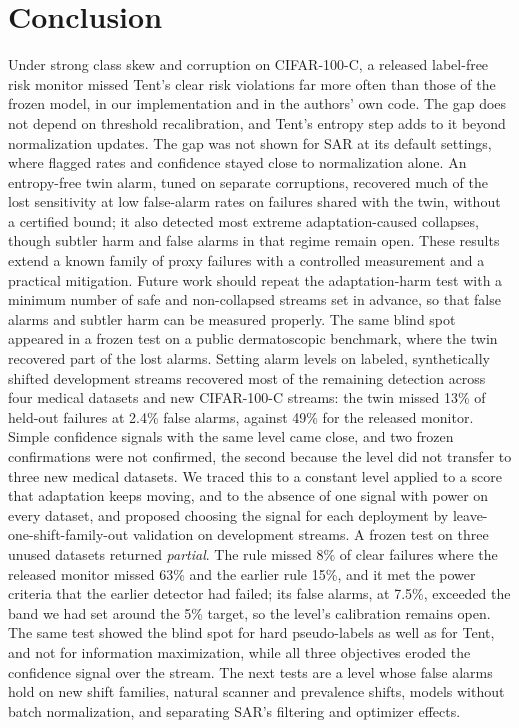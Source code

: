 \documentclass[runningheads]{llncs}
\begin{document}
\section{Conclusion}
Under strong class skew and corruption on CIFAR-100-C, a released label-free risk monitor missed Tent's clear risk violations far more often than those of the frozen model, in our implementation and in the authors' own code. The gap does not depend on threshold recalibration, and Tent's entropy step adds to it beyond normalization updates. The gap was not shown for SAR at its default settings, where flagged rates and confidence stayed close to normalization alone. An entropy-free twin alarm, tuned on separate corruptions, recovered much of the lost sensitivity at low false-alarm rates on failures shared with the twin, without a certified bound; it also detected most extreme adaptation-caused collapses, though subtler harm and false alarms in that regime remain open. These results extend a known family of proxy failures with a controlled measurement and a practical mitigation. Future work should repeat the adaptation-harm test with a minimum number of safe and non-collapsed streams set in advance, so that false alarms and subtler harm can be measured properly. The same blind spot appeared in a frozen test on a public dermatoscopic benchmark, where the twin recovered part of the lost alarms. Setting alarm levels on labeled, synthetically shifted development streams recovered most of the remaining detection across four medical datasets and new CIFAR-100-C streams: the twin missed 13\% of held-out failures at 2.4\% false alarms, against 49\% for the released monitor. Simple confidence signals with the same level came close, and two frozen confirmations were not confirmed, the second because the level did not transfer to three new medical datasets. We traced this to a constant level applied to a score that adaptation keeps moving, and to the absence of one signal with power on every dataset, and proposed choosing the signal for each deployment by leave-one-shift-family-out validation on development streams. A frozen test on three unused datasets returned \emph{partial}. The rule missed 8\% of clear failures where the released monitor missed 63\% and the earlier rule 15\%, and it met the power criteria that the earlier detector had failed; its false alarms, at 7.5\%, exceeded the band we had set around the 5\% target, so the level's calibration remains open. The same test showed the blind spot for hard pseudo-labels as well as for Tent, and not for information maximization, while all three objectives eroded the confidence signal over the stream. The next tests are a level whose false alarms hold on new shift families, natural scanner and prevalence shifts, models without batch normalization, and separating SAR's filtering and optimizer effects.



\end{document}
